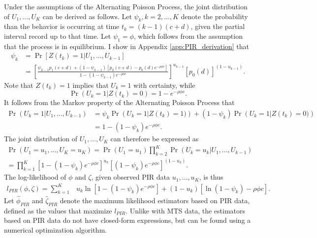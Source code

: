 \documentclass[man, noextraspace, floatsintext]{apa6}\usepackage[]{graphicx}\usepackage[]{color}
\begin{document}
Under the assumptions of the Alternating Poisson Process, the joint distribution of $U_1,...,U_K$ can be derived as follows. 
Let $\psi_k, k = 2,...,K$ denote the probability than the behavior is occurring at time $t_k = (k-1)(c + d)$, given the partial interval record up to that time. 
Let $\psi_1 = \phi$, which follows from the assumption that the process is in equilibrium. I show in Appendix \ref{app:PIR_derivation} that  
\begin{equation}
\label{eq:psi_k}
\begin{aligned}
\psi_k &= \Pr\left[ Z(t_k) = 1 \left| U_1,...,U_{k-1}\right.\right] \\
 &= \left[\frac{\psi_{k-1} p_1(c + d) + (1 - \psi_{k-1}) \left[p_0(c + d) - p_0(d) e^{- \rho \phi c}\right]}{1 - (1 - \psi_{k-1}) e^{- \rho \phi c }}\right]^{u_{k-1}} \left[p_0(d)\right]^{(1 - u_{k-1})}.
\end{aligned}
\end{equation}
Note that $Z(t_k) = 1$ implies that $U_k = 1$ with certainty, while 
\[ \Pr\left(U_k = 1\left| Z(t_k) = 0\right.\right) = 1 - e^{- \rho \phi c}.\]
It follows from the Markov property of the Alternating Poisson Process that 
\begin{align*}
\Pr\left(U_k = 1 \left| U_1,...,U_{k-1}\right.\right) &= \psi_k \Pr\left(U_k = 1 \left| Z(t_k) = 1)\right.\right)  + (1 - \psi_k)\Pr\left(U_k = 1 \left| Z(t_k) = 0)\right.\right) \\
&= 1 - (1 - \psi_k)e^{- \rho \phi c}.
\end{align*}
The joint distribution of $U_1,...,U_K$ can therefore be expressed as 
\begin{multline}
\label{eq:PIR_joint}
\Pr\left(U_1 =u_1,...,U_K = u_K\right) = \Pr\left(U_1=u_1\right) \prod_{k=2}^{K}\Pr\left(U_k=u_k \left| U_1,...,U_{k-1}\right.\right)  \\
= \prod_{k=1}^{K} \left[1 - (1 - \psi_k)e^{- \rho \phi c} \right]^{u_k} \left[(1 - \psi_k) e^{- \rho \phi c}\right]^{(1 - u_k)}.
\end{multline}
The log-likelihood of $\phi$ and $\zeta$, given observed PIR data $u_1,...,u_K$, is thus
\begin{align}
\label{eq:PIR_loglik}
l_{PIR}\left(\phi,\zeta\right) = \sum_{k=1}^{K} & u_k \ln\left[1 - (1 - \psi_k)e^{- \rho \phi c}\right]  + (1 - u_k)\left[\ln\left(1 - \psi_k \right) - \rho \phi c\right].
\end{align}
Let $\hat\phi_{PIR}$ and $\hat\zeta_{PIR}$ denote the maximum likelihood estimators based on PIR data, defined as the values that maximize $l_{PIR}$. Unlike with MTS data, the estimators based on PIR data do not have closed-form expressions, but can be found using a numerical optimization algorithm. 
\end{document}

